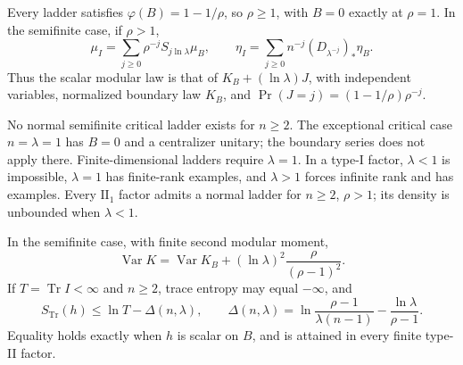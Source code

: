 \begin{theorem}\label{thm:ladder}
Every ladder satisfies $\varphi(B)=1-1/\rho$, so $\rho\ge1$, with $B=0$ exactly at $\rho=1$. In the semifinite case, if $\rho>1$,
\begin{equation}\label{eq:general-renewal}
 \mu_I=\sum_{j\ge0}\rho^{-j}S_{j\ln\lambda}\mu_B,
 \qquad \eta_I=\sum_{j\ge0}n^{-j}(D_{\lambda^{-j}})_*\eta_B.
\end{equation}
Thus the scalar modular law is that of $K_B+(\ln\lambda)J$, with independent variables, normalized boundary law $K_B$, and $\Pr(J=j)=(1-1/\rho)\rho^{-j}$.

No normal semifinite critical ladder exists for $n\ge2$. The exceptional critical case $n=\lambda=1$ has $B=0$ and a centralizer unitary; the boundary series does not apply there. Finite-dimensional ladders require $\lambda=1$. In a type-I factor, $\lambda<1$ is impossible, $\lambda=1$ has finite-rank examples, and $\lambda>1$ forces infinite rank and has examples. Every $\mathrm{II}_1$ factor admits a normal ladder for $n\ge2$, $\rho>1$; its density is unbounded when $\lambda<1$.

In the semifinite case, with finite second modular moment,
\[
 \operatorname{Var}K=\operatorname{Var}K_B+
       (\ln\lambda)^2\frac{\rho}{(\rho-1)^2}.
\]
If $T=\operatorname{Tr}I<\infty$ and $n\ge2$, trace entropy may equal $-\infty$, and
\begin{equation}\label{eq:general-deficit}
 S_{\operatorname{Tr}}(h)\le\ln T-\Delta(n,\lambda),\qquad
 \Delta(n,\lambda)=\ln\frac{\rho-1}{\lambda(n-1)}-
                         \frac{\ln\lambda}{\rho-1}.
\end{equation}
Equality holds exactly when $h$ is scalar on $B$, and is attained in every finite type-II factor.
\end{theorem}
